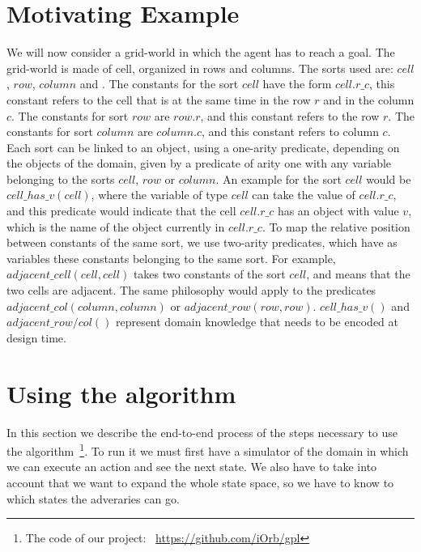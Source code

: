 \documentclass[a4paper]{article}
\begin{document}
\section{Motivating Example}

We will now consider a grid-world in which the agent has to reach a goal. The grid-world is made of cell, organized in rows and columns. The sorts used are: $cell$, $row$, $column$ and . The constants for the sort $cell$ have the form $cell.r\_c$, this constant refers to the cell that is at the same time in the row $r$ and in the column $c$. The constants for sort $row$ are $row.r$, and this constant refers to the row $r$. The constants for sort $column$ are $column.c$, and this constant refers to column $c$. Each sort can be linked to an object, using a one-arity predicate, depending on the objects of the domain, given by a predicate of arity one with any variable belonging to the sorts $cell$, $row$ or $column$. An example for the sort $cell$ would be $cell\_has\_v(cell)$, where the variable of type $cell$ can take the value of $cell.r\_c$, and this predicate would indicate that the cell $cell.r\_c$ has an object with value $v$, which is the name of the object currently in $cell.r\_c$. To map the relative position between constants of the same sort, we use two-arity predicates, which have as variables these constants belonging to the same sort. For example, $adjacent\_cell(cell, cell)$ takes two constants of the sort $cell$, and means that the two cells are adjacent. The same philosophy would apply to the predicates $adjacent\_col(column, column)$ or $adjacent\_row(row, row)$. $cell\_has\_v()$ and $adjacent\_row/col()$ represent domain knowledge that needs to be encoded at design time.

\section{Using the algorithm}

In this section we describe the end-to-end process of the steps necessary to use the algorithm~\footnote{The code of our project: ~\url{https://github.com/iOrb/gpl}}. To run it we must first have a simulator of the domain in which we can execute an action and see the next state. We also have to take into account that we want to expand the whole state space, so we have to know to which states the adveraries can go.
\end{document}
